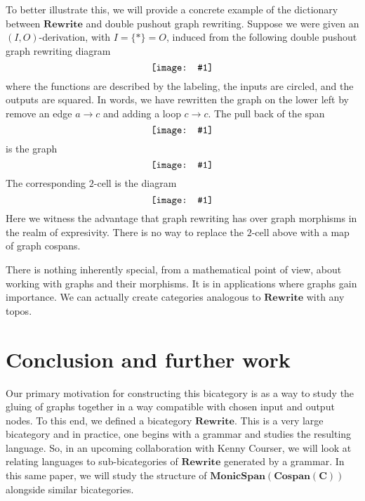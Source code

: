 \documentclass[11pt]{amsart}
\newcommand{\cat}[1]{\mathbf{#1}}
\newcommand{\diagram}[1]{\raisebox{-0.5\height}{\texttt{[image: \#1]}}}
\theoremstyle{remark}
\theoremstyle{definition}
\begin{document}
To better illustrate this, we will provide a concrete example of the dictionary between $\cat{Rewrite}$ and double pushout graph rewriting.  Suppose we were given an $(I,O)$-derivation, with $I=\{\ast\}=O$, induced from the following double pushout graph rewriting diagram
\[
	\label{NoRef_DPOGraphRewritingExample}
	\diagram{NoRef_DPOGraphRewritingExample}
\]
where the functions are described by the labeling, the inputs are circled, and the outputs are squared. In words, we have rewritten the graph on the lower left by remove an edge $a \to c$ and adding a loop $c \to c$. The pull back of the span
\[
	\label{NoRef_DPOGraphRewritingExample2}
	\diagram{NoRef_DPOGraphRewritingExample2}
\]
is the graph
\[
	\label{NoRef_DPOGraphRewritingExample3}
	\diagram{NoRef_DPOGraphRewritingExample3}
\]
The corresponding $2$-cell is the diagram
\[
	\label{NoRef_DPOGraphRewritingExample4}
	\diagram{NoRef_DPOGraphRewritingExample4}
\]
Here we witness the advantage that graph rewriting has over graph morphisms in the realm of expresivity. There is no way to replace the $2$-cell above with a map of graph cospans. 

There is nothing inherently special, from a mathematical point of view, about working with graphs and their morphisms.  It is in applications where graphs gain importance.  We can actually create categories analogous to $\cat{Rewrite}$ with any topos.  
%
%
%
%
%
%
\section{Conclusion and further work}  %

Our primary motivation for constructing this bicategory is as a way to study the gluing of graphs together in a way compatible with chosen input and output nodes. To this end, we defined a bicategory $\cat{Rewrite}$. This is a very large bicategory and in practice, one begins with a grammar and studies the resulting language. So, in an upcoming collaboration with Kenny Courser, we will look at relating languages to sub-bicategories of $\cat{Rewrite}$ generated by a grammar. In this same paper, we will study the structure of $\cat{MonicSpan(Cospan(C))}$ alongside similar bicategories. 


%
% 
\end{document}
